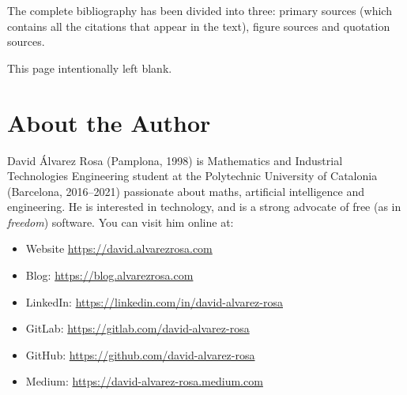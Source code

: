 

\printbibheading[heading=bibintoc]\label{cha:references}
\noindent The complete bibliography has been divided into three: primary
sources (which contains all the citations that appear in the text), figure
sources and quotation sources. \bigskip\medskip

\printbibliography[heading=subbibintoc, title={Primary Sources}]
\printbibliography[heading=subbibintoc, category={figure}, title={Figure Sources}]
\printbibliography[heading=subbibintoc, category={quote}, title={Quotation Sources}]





\printindex




\cleardoublepage{}
\thispagestyle{empty}
\null\vfill
\begin{center}
  \vspace{-2ex}
  This page intentionally left blank.
\end{center}
\vfill\null{}



\chapter*{About the Author}
\thispagestyle{empty}

David Álvarez Rosa (Pamplona, 1998) is Mathematics and Industrial Technologies
Engineering student at the Polytechnic University of Catalonia (Barcelona,
2016--2021) passionate about maths, artificial intelligence and engineering. He
is interested in technology, and is a strong advocate of free (as in
\textit{freedom}) software. You can visit him online at:

\begin{itemize}
  \item Website \url{https://david.alvarezrosa.com}
  \item Blog: \url{https://blog.alvarezrosa.com}
  \item LinkedIn: \url{https://linkedin.com/in/david-alvarez-rosa}
  \item GitLab: \url{https://gitlab.com/david-alvarez-rosa}
  \item GitHub: \url{https://github.com/david-alvarez-rosa}
  \item Medium: \url{https://david-alvarez-rosa.medium.com}
\end{itemize}

